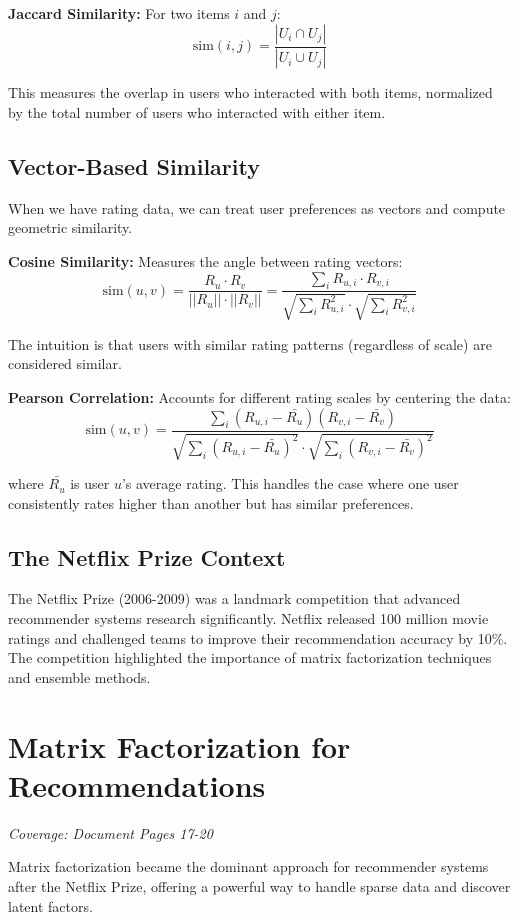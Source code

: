 \documentclass[11pt,a4paper]{article}
\begin{document}
\textbf{Jaccard Similarity:} For two items $i$ and $j$:
$$\text{sim}(i,j) = \frac{|U_i \cap U_j|}{|U_i \cup U_j|}$$

This measures the overlap in users who interacted with both items, normalized by the total number of users who interacted with either item.

\subsection{Vector-Based Similarity}
When we have rating data, we can treat user preferences as vectors and compute geometric similarity.

\textbf{Cosine Similarity:} Measures the angle between rating vectors:
$$\text{sim}(u,v) = \frac{R_u \cdot R_v}{||R_u|| \cdot ||R_v||} = \frac{\sum_i R_{u,i} \cdot R_{v,i}}{\sqrt{\sum_i R_{u,i}^2} \cdot \sqrt{\sum_i R_{v,i}^2}}$$

The intuition is that users with similar rating patterns (regardless of scale) are considered similar.

\textbf{Pearson Correlation:} Accounts for different rating scales by centering the data:
$$\text{sim}(u,v) = \frac{\sum_i (R_{u,i} - \bar{R_u})(R_{v,i} - \bar{R_v})}{\sqrt{\sum_i (R_{u,i} - \bar{R_u})^2} \cdot \sqrt{\sum_i (R_{v,i} - \bar{R_v})^2}}$$

where $\bar{R_u}$ is user $u$'s average rating. This handles the case where one user consistently rates higher than another but has similar preferences.

\subsection{The Netflix Prize Context}
The Netflix Prize (2006-2009) was a landmark competition that advanced recommender systems research significantly. Netflix released 100 million movie ratings and challenged teams to improve their recommendation accuracy by 10\%. The competition highlighted the importance of matrix factorization techniques and ensemble methods.

\section{Matrix Factorization for Recommendations}
\textit{Coverage: Document Pages 17-20}

Matrix factorization became the dominant approach for recommender systems after the Netflix Prize, offering a powerful way to handle sparse data and discover latent factors.
\end{document}
